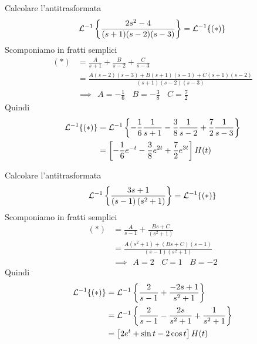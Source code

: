 Calcolare l'antitrasformata
\begin{equation*}
\mathcal{L}^{ - 1}\left\{\frac{2s^{2} - 4}{(s + 1)(s - 2)(s - 3)}\right\} = \mathcal{L}^{ - 1}\{(*)\}
\end{equation*}
Scomponiamo in fratti semplici
\begin{equation*}
\begin{aligned}
(*) & = \frac{A}{s + 1} + \frac{B}{s - 2} + \frac{C}{s - 3}\\
 & = \frac{A(s - 2)(s - 3) + B(s + 1)(s - 3) + C(s + 1)(s - 2)}{(s + 1)(s - 2)(s - 3)}\\
 & \implies \ \ A = -\frac{1}{6} \ \ \ \ B = -\frac{3}{8} \ \ \ \ C = \frac{7}{2}
\end{aligned}
\end{equation*}
Quindi
\begin{equation*}
\begin{aligned}
\mathcal{L}^{ - 1}\{(*)\} & = \mathcal{L}^{ - 1}\left\{ - \frac{1}{6}\frac{1}{s + 1} - \frac{3}{8}\frac{1}{s - 2} + \frac{7}{2}\frac{1}{s - 3}\right\}\\
 & = \left[ - \frac{1}{6} e^{ - t} - \frac{3}{8} e^{2t} + \frac{7}{2} e^{3t}\right] H(t)
\end{aligned}
\end{equation*}
\Esercizio{}

Calcolare l'antitrasformata
\begin{equation*}
\mathcal{L}^{ - 1}\left\{\frac{3s + 1}{(s - 1)\left(s^{2} + 1\right)}\right\} = \mathcal{L}^{ - 1}\{(*)\}
\end{equation*}
Scomponiamo in fratti semplici
\begin{equation*}
\begin{aligned}
(*) & = \frac{A}{s - 1} + \frac{Bs + C}{\left(s^{2} + 1\right)}\\
 & = \frac{A\left(s^{2} + 1\right) + (Bs + C)(s - 1)}{(s - 1)\left(s^{2} + 1\right)}\\
 & \implies \ \ A = 2\ \ \ \ C = 1\ \ \ \ B = -2
\end{aligned}
\end{equation*}
Quindi
\begin{equation*}
\begin{aligned}
\mathcal{L}^{ - 1}\{(*)\} & = \mathcal{L}^{ - 1}\left\{\frac{2}{s - 1} + \frac{ - 2s + 1}{s^{2} + 1}\right\}\\
 & = \mathcal{L}^{ - 1}\left\{\frac{2}{s - 1} - \frac{2s}{s^{2} + 1} + \frac{1}{s^{2} + 1}\right\}\\
 & = \left[ 2e^{t} + \sin t - 2\cos t\right] H(t)
\end{aligned}
\end{equation*}
\Esercizio{}

